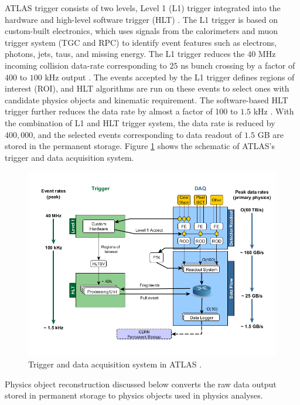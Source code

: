 ATLAS trigger consists of two levels, Level 1 (L1) trigger integrated into the hardware and high-level software trigger (HLT) \cite{TriggerSystemATLAS}. The L1 trigger is based on custom-built electronics, which uses signals from the calorimeters and muon trigger system (TGC and RPC) to identify event features such as electrons, photons, jets, taus, and missing energy. The L1 trigger reduces the $40$ MHz incoming collision data-rate corresponding to $25$ ns bunch crossing by a factor of $400$ to $100$ kHz output \cite{TriggerSystemATLAS}. The events accepted by the L1 trigger defines regions of interest (ROI), and HLT algorithms are run on these events to select ones with candidate physics objects and kinematic requirement. The software-based HLT trigger further reduces the data rate by almost a factor of 100 to $1.5$ kHz \cite{ATLAS}. With the combination of L1 and HLT trigger system, the data rate is reduced by $400,000$, and the selected events corresponding to data readout of $1.5$ GB are stored in the permanent storage. Figure \ref{fig:DAQ} shows the schematic of ATLAS's trigger and data acquisition system. 

\begin{figure}
    \centering
    \includegraphics[width=.98\linewidth]{figures/LHC/DAQ_ATLAS.png}
    \caption{ Trigger and data acquisition system in ATLAS \cite{ATLAS_DAQ}.\label{fig:DAQ}}
\end{figure}

Physics object reconstruction discussed below converts the raw data output stored in permanent storage to physics objects used in physics analyses. 

